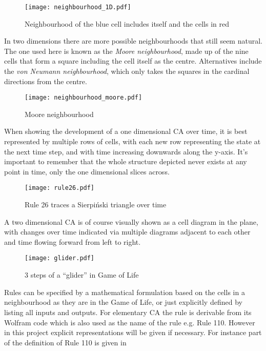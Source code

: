 \begin{figure}[h]
    \centering
    \texttt{[image: neighbourhood\_1D.pdf]}
    \caption{Neighbourhood of the {\color{blue} blue} cell includes itself and the cells in {\color{red} red}}
    \label{fig:nbhd_1D}
\end{figure}

In two dimensions there are more possible neighbourhoods that still seem natural.
The one used here is known as the \emph{Moore neighbourhood},
made up of the nine cells that form a square including the cell itself as the centre.
Alternatives include the \emph{von Neumann neighbourhood},
which only takes the squares in the cardinal directions from the centre.


\begin{figure}[h]
    \centering
    \texttt{[image: neighbourhood\_moore.pdf]}
    \caption{Moore neighbourhood}
    \label{fig:moore}
\end{figure}

When showing the development of a one dimensional CA over time,
it is best represented by multiple rows of cells, 
with each new row representing the state at the next time step,
and with time increasing downwards along the y-axis.
It's important to remember that the whole structure depicted never exists at any point in time,
only the one dimensional slices across.

\begin{figure}[h]
    \centering
    \texttt{[image: rule26.pdf]}
    \caption{Rule 26 traces a Sierpi\'{n}ski triangle over time}
    \label{fig:rule26}
\end{figure}

A two dimensional CA is of course visually shown as a cell diagram in the plane,
with changes over time indicated via multiple diagrams adjacent to each other
and time flowing forward from left to right.

\begin{figure}[h]
    \centering
    \texttt{[image: glider.pdf]}
    \caption{3 steps of a ``glider'' in Game of Life}
    \label{fig:glider}
\end{figure}

Rules can be specified by a mathematical formulation based on the cells in a neighbourhood as they are in the Game of Life,
or just explicitly defined by listing all inputs and outputs.
For elementary CA the rule is derivable from its Wolfram code which is also used as the name of the rule e.g. Rule 110.
However in this project explicit representations will be given if necessary.
For instance part of the definition of Rule 110 is given in 

